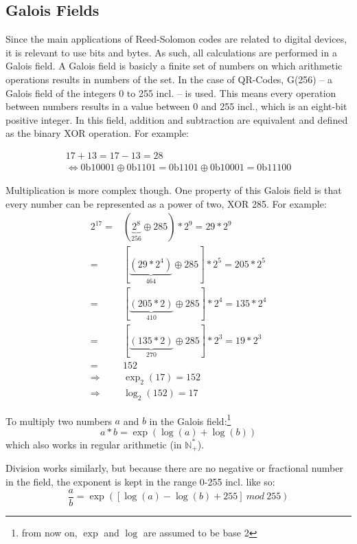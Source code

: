 \subsection{Galois Fields}
\label{ssec:rs_galois}
Since the main applications of Reed-Solomon codes are related to digital devices, it is relevant to use bits and bytes. As such, all calculations are performed in a Galois field. A Galois field is basicly a finite set of numbers on which arithmetic operations results in numbers of the set. In the case of QR-Codes, G(256) -- a Galois field of the integers 0 to 255 incl. -- is used. This means every operation between numbers results in a value between 0 and 255 incl., which is an eight-bit positive integer. In this field, addition and subtraction are equivalent and defined as the binary XOR operation. For example:

\begin{gather*}
  17 + 13 = 17 - 13 = 28 \\
  \Leftrightarrow 0\text{b}10001 \oplus 0\text{b}1101 = 0\text{b}1101 \oplus 0\text{b}10001 = 0\text{b}11100
\end{gather*}

Multiplication is more complex though. One property of this Galois field is that every number can be represented as a power of two, XOR 285.
For example:
\begin{equation*}
  \begin{split}
    2^{17} =& (\underbrace{2^8}_{256} \oplus 285) * 2^9 = 29 * 2^9 \\
         =& [\underbrace{(29 * 2^4)}_{464} \oplus 285] * 2^5 = 205 * 2^5 \\
         =& [\underbrace{(205 * 2)}_{410} \oplus 285] * 2^4 = 135 * 2^4 \\
         =& [\underbrace{(135 * 2)}_{270} \oplus 285] * 2^3 = 19 * 2^3 \\
         =& 152 \\
    \Rightarrow& \exp_2(17) = 152 \\
    \Rightarrow& \log_2(152) = 17
  \end{split}
\end{equation*}

To multiply two numbers $a$ and $b$ in the Galois field:\footnote{from now on, $\exp$ and $\log$ are assumed to be base 2} \[
  a * b = \exp(\log(a) + \log(b))
\]
which also works in regular arithmetic (in $\mathbb{N}^*_+$).

Division works similarly, but because there are no negative or fractional number in the field, the exponent is kept in the range 0-255 incl. like so: \[
  \frac{a}{b} = \exp([\log(a) - \log(b) + 255]\ mod \ 255)
\]

